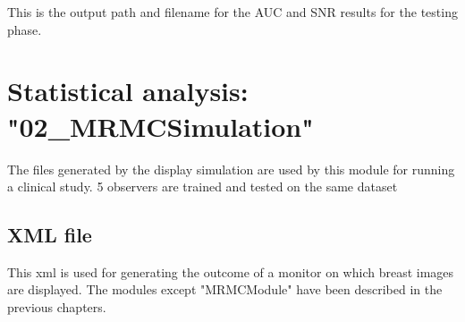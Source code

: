 This is the output path and filename for the AUC and SNR results for the testing phase.


\section{Statistical analysis: "02\_MRMCSimulation"}

The files generated by the display simulation are used by this module for running a clinical study. 5 observers are trained and tested on the same dataset

\subsection{XML file}

This xml is used for generating the outcome of a monitor on which breast images are displayed. The modules except "MRMCModule" have been described in the previous chapters.

